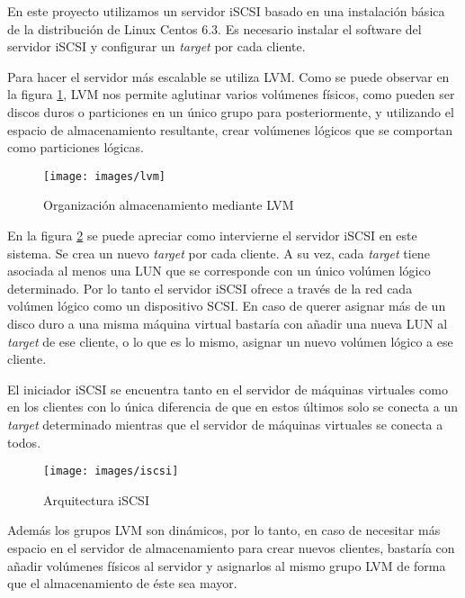 \documentclass[spanisheDIVcalc,twoside,parskip-,pointlessnumbers,final]{scrbook}
\begin{document}
En este proyecto utilizamos un servidor iSCSI basado en una instalación
básica de la distribución de Linux Centos 6.3. Es necesario instalar
el software del servidor iSCSI y configurar un \emph{target }por cada
cliente. 

Para hacer el servidor más escalable se utiliza LVM. Como se puede
observar en la figura \ref{LVM}, LVM nos permite aglutinar varios
volúmenes físicos, como pueden ser discos duros o particiones en un
único grupo para posteriormente, y utilizando el espacio de almacenamiento
resultante, crear volúmenes lógicos que se comportan como particiones
lógicas. 

\begin{figure}[htpb]
\begin{centering}
\texttt{[image: images/lvm]}
\par\end{centering}

\caption{Organización almacenamiento mediante LVM}
\label{LVM}
\end{figure}


En la figura \ref{Arquitectura iSCSI} se puede apreciar como intervierne
el servidor iSCSI en este sistema. Se crea un nuevo \emph{target}
por cada cliente. A su vez, cada \emph{target} tiene asociada al menos
una LUN que se corresponde con un único volúmen lógico determinado.
Por lo tanto el servidor iSCSI ofrece a través de la red cada volúmen
lógico como un dispositivo SCSI. En caso de querer asignar más de
un disco duro a una misma máquina virtual bastaría con añadir una
nueva LUN al \emph{target }de ese cliente, o lo que es lo mismo, asignar
un nuevo volúmen lógico a ese cliente. 

El iniciador iSCSI se encuentra tanto en el servidor de máquinas virtuales
como en los clientes con lo única diferencia de que en estos últimos
solo se conecta a un \emph{target }determinado mientras que el servidor
de máquinas virtuales se conecta a todos.

\begin{figure}[htpb]
\begin{centering}
\texttt{[image: images/iscsi]}
\par\end{centering}

\caption{Arquitectura iSCSI}
\label{Arquitectura iSCSI}

\end{figure}


Además los grupos LVM son dinámicos, por lo tanto, en caso de necesitar
más espacio en el servidor de almacenamiento para crear nuevos clientes,
bastaría con añadir volúmenes físicos al servidor y asignarlos al
mismo grupo LVM de forma que el almacenamiento de éste sea mayor.
\end{document}
